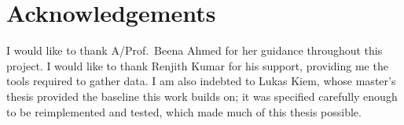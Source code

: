 \chapter*{Acknowledgements}\label{ack}

I would like to thank A/Prof.\ Beena Ahmed for her guidance throughout this
project. I would like to thank Renjith Kumar for his support, providing me the tools required to gather data. I am also indebted to Lukas Kiem, whose master's thesis provided the baseline
this work builds on; it was specified carefully enough to be reimplemented and
tested, which made much of this thesis possible.
